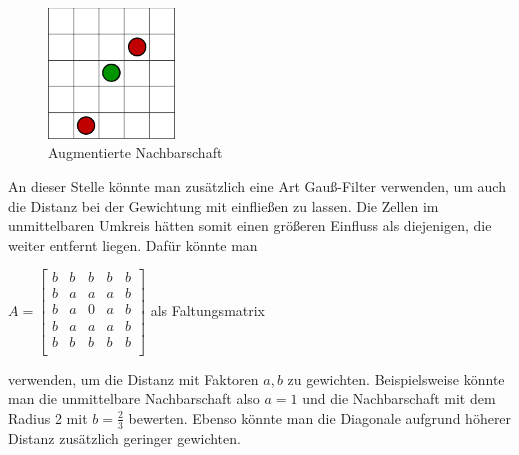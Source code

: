 \documentclass[10pt,twocolumn]{scrartcl}
\begin{document}
\begin{figure}[H]
	\centering
	\includegraphics[width= 0.3\textwidth]{./images/ewNachbar.pdf}
	\caption{Augmentierte Nachbarschaft}
	\label{fig:ewnachbar}
\end{figure}
An dieser Stelle könnte man zusätzlich eine Art Gauß-Filter verwenden, um auch die Distanz bei der Gewichtung mit einfließen zu lassen. Die Zellen im unmittelbaren Umkreis hätten somit einen größeren Einfluss als diejenigen, die weiter entfernt liegen.
Dafür könnte man 
\begin{center}
 $A = 
\begin{bmatrix}
b & b & b & b & b \\
b & a & a & a & b \\
b & a & 0 & a & b \\
b & a & a & a & b \\
b & b & b & b & b \\
\end{bmatrix}
$ als Faltungsmatrix
\end{center} verwenden, um die Distanz mit Faktoren $a,b$ zu gewichten. Beispielsweise könnte man die unmittelbare Nachbarschaft also $a=1$ und die Nachbarschaft mit dem Radius 2 mit $b=\frac{2}{3}$ bewerten. Ebenso könnte man die Diagonale aufgrund höherer Distanz zusätzlich geringer gewichten.

%
\end{document}
